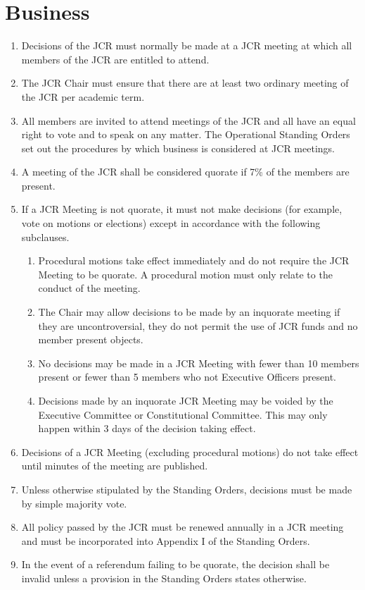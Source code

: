 \documentclass[12pt]{article}
\begin{document}
\section{Business}
\begin{enumerate}
    \item Decisions of the JCR must normally be made at a JCR meeting at which all members of the JCR are entitled to attend.
    \item The JCR Chair must ensure that there are at least two ordinary meeting of the JCR per academic term.
    \item All members are invited to attend meetings of the JCR and all have an equal right to vote and to speak on any matter. The Operational Standing Orders set out the procedures by which business is considered at JCR meetings.
    \item A meeting of the JCR shall be considered quorate if 7\% of the members are present.
    \item If a JCR Meeting is not quorate, it must not make decisions (for example, vote on motions or elections) except in accordance with the following subclauses.
    \begin{enumerate}
        \item Procedural motions take effect immediately and do not require the JCR Meeting to be quorate. A procedural motion must only relate to the conduct of the meeting.
        \item The Chair may allow decisions to be made by an inquorate meeting if they are uncontroversial, they do not permit the use of JCR funds and no member present objects.
        \item No decisions may be made in a JCR Meeting with fewer than 10 members present or fewer than 5 members who not Executive Officers present.
        \item Decisions made by an inquorate JCR Meeting may be voided by the Executive Committee or Constitutional Committee. This may only happen within 3 days of the decision taking effect.
    \end{enumerate}
    \item Decisions of a JCR Meeting (excluding procedural motions) do not take effect until minutes of the meeting are published.
    \item Unless otherwise stipulated by the Standing Orders, decisions must be made by simple majority vote.
    \item All policy passed by the JCR must be renewed annually in a JCR meeting and must be incorporated into Appendix I of the Standing Orders.
    \item In the event of a referendum failing to be quorate, the decision shall be invalid unless a provision in the Standing Orders states otherwise.

\end{enumerate}
\end{document}
